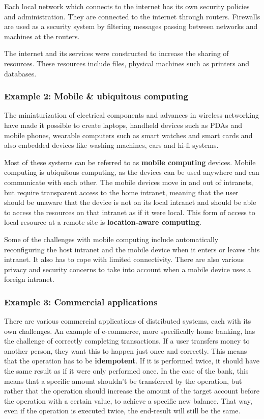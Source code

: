 \documentclass[a4paper]{article}
\begin{document}
Each local network which connects to the internet has its own security policies and administration. They are connected to the internet through routers. Firewalls are used as a security system by filtering messages passing between networks and machines at the routers.

The internet and its services were constructed to increase the sharing of resources. These resources include files, physical machines such as printers and databases.

\subsubsection{Example 2: Mobile \& ubiquitous computing}

The miniaturization of electrical components and advances in wireless networking have made it possible to create laptops, handheld devices such as PDAs and mobile phones, wearable computers such as smart watches and smart cards and also embedded devices like washing machines, cars and hi-fi systems.

Most of these systems can be referred to as \textbf{mobile computing} devices. Mobile computing is ubiquitous computing, as the devices can be used anywhere and can communicate with each other. The mobile devices move in and out of intranets, but require transparent access to the home intranet, meaning that the user should be unaware that the device is not on its local intranet and should be able to access the resources on that intranet as if it were local. This form of access to local resource at a remote site is \textbf{location-aware computing}.

Some of the challenges with mobile computing include automatically reconfiguring the host intranet and the mobile device when it enters or leaves this intranet. It also has to cope with limited connectivity. There are also various privacy and security concerns to take into account when a mobile device uses a foreign intranet.

\subsubsection{Example 3: Commercial applications}

There are various commercial applications of distributed systems, each with its own challenges. An example of e-commerce, more specifically home banking, has the challenge of correctly completing transactions. If a user transfers money to another person, they want this to happen just once and correctly. This means that the operation has to be \textbf{idempotent}. If it is performed twice, it should have the same result as if it were only performed once. In the case of the bank, this means that a specific amount shouldn't be transferred by the operation, but rather that the operation should increase the amount of the target account before the operation with a certain value, to achieve a specific new balance. That way, even if the operation is executed twice, the end-result will still be the same.
\end{document}
